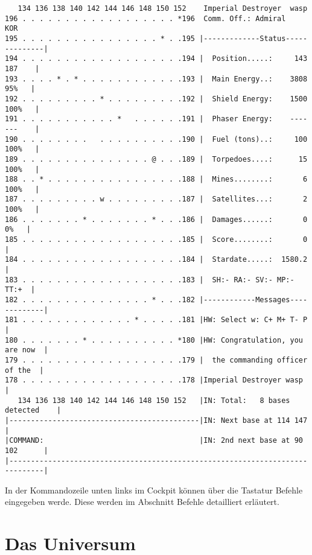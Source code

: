 \footnotesize
\hspace{-1.0cm}
\begin{verbatim}
   134 136 138 140 142 144 146 148 150 152    Imperial Destroyer  wasp
196 . . . . . . . . . . . . . . . . . . *196  Comm. Off.: Admiral    KOR
195 . . . . . . . . . . . . . . . . * . .195 |-------------Status--------------|
194 . . . . . . . . . . . . . . . . . . .194 |  Position.....:     143  187    |
193 . . . . * . * . . . . . . . . . . . .193 |  Main Energy..:    3808   95%   |
192 . . . . . . . . . * . . . . . . . . .192 |  Shield Energy:    1500  100%   |
191 . . . . . . . . . . . *   . . . . . .191 |  Phaser Energy:    ----  ---    |
190 . . . . . . . .   . . . . . . . . . .190 |  Fuel (tons)..:     100  100%   |
189 . . . . . . . . . . . . . . . @ . . .189 |  Torpedoes....:      15  100%   |
188 . . * . . . . . . . . . . . . . . . .188 |  Mines........:       6  100%   |
187 . . . . . . . . . w . . . . . . . . .187 |  Satellites...:       2  100%   |
186 . . . . . . . * . . . . . . . * . . .186 |  Damages......:       0    0%   |
185 . . . . . . . . . . . . . . . . . . .185 |  Score........:       0         |
184 . . . . . . . . . . . . . . . . . . .184 |  Stardate.....:  1580.2         |
183 . . . . . . . . . . . . . . . . . . .183 |  SH:- RA:- SV:- MP:-      TT:+  |
182 . . . . . . . . . . . . . . . * . . .182 |------------Messages-------------|
181 . . . . . . . . . . . . . * . . . . .181 |HW: Select w: C+ M+ T- P         |
180 . . . . . . . * . . . . . . . . . . *180 |HW: Congratulation, you are now  |
179 . . . . . . . . . . . . . . . . . . .179 |  the commanding officer of the  |
178 . . . . . . . . . . . . . . . . . . .178 |Imperial Destroyer wasp          |
   134 136 138 140 142 144 146 148 150 152   |IN: Total:   8 bases detected    |
|--------------------------------------------|IN: Next base at 114 147         |
|COMMAND:                                    |IN: 2nd next base at 90 102      |
|------------------------------------------------------------------------------|
\end{verbatim}

\normalsize

In der Kommandozeile unten links im Cockpit k\"onnen \"uber die 
Tastatur Befehle eingegeben werde. Diese werden im Abschnitt Befehle
detailliert erl\"autert.

\section{Das Universum}

